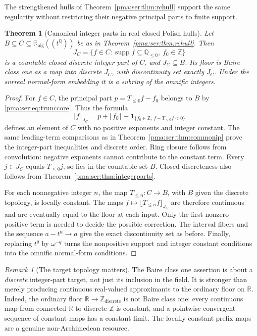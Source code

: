 \documentclass[11pt]{article}
\numberwithin{equation}{section}
\newtheorem{theorem}{Theorem}[section]
\theoremstyle{definition}
\theoremstyle{remark}
\newtheorem{remark}[remark]{Remark}
\newcommand{\Z}{\mathbb Z}
\newcommand{\Q}{\mathbb Q}
\newcommand{\R}{\mathbb R}
\newcommand{\supp}{\operatorname{supp}}
\newcommand{\ka}{\mathbb R_{\mathrm{alg}}}
\begin{document}
The strengthened hulls of Theorem~\ref{pma:ser:thm:rchull} support the same regularity
without restricting their negative principal parts to finite support.

\begin{theorem}[Canonical integer parts in real closed Polish hulls]
\label{pma:ser:thm:hullfloor}
Let $B\subseteq C\subseteq\ka((t^\Q))$ be as in
Theorem~\ref{pma:ser:thm:rchull}. Then
\[
 J_C=\{f\in C:\supp f\subseteq\Q_{\leq0},\ f_0\in\Z\}
\]
is a countable closed discrete integer part of $C$, and $J_C\subseteq B$.
Its floor is Baire class one as a map into discrete $J_C$, with discontinuity
set exactly $J_C$. Under the surreal normal-form embedding it is a subring
of the omnific integers.
\end{theorem}
\begin{proof}
For $f\in C$, the principal part
$p=T_{\leq0}f-f_0$ belongs to $B$ by \eqref{pma:ser:eq:trunccore}. Thus the formula
\[
 \lfloor f\rfloor_{J_C}
 =p+\lfloor f_0\rfloor
  -\mathbf1_{\{f_0\in\Z,\ f-T_{\leq0}f<0\}}
\]
defines an element of $C$ with no positive exponents and integer constant.
The same leading-term comparisons as in Theorem~\ref{pma:ser:thm:commonip} prove
the integer-part inequalities and discrete order. Ring closure follows from
convolution: negative exponents cannot contribute to the constant term.
Every $j\in J_C$ equals $T_{\leq0}j$, so lies in the countable set $B$.
Closed discreteness also follows from Theorem~\ref{pma:ser:thm:integerparts}.

For each nonnegative integer $n$, the map $T_{\leq n}:C\to B$, with $B$
given the discrete topology, is locally constant. The maps
$f\mapsto\lfloor T_{\leq n}f\rfloor_{J_C}$ are therefore continuous and
are eventually equal to the floor at each input. Only the first nonzero
positive term is needed to decide the possible correction. The interval
fibers and the sequence $a-t^n\to a$ give the exact discontinuity set as
before. Finally, replacing $t^q$ by $\omega^{-q}$ turns the nonpositive
support and integer constant conditions into the omnific normal-form
conditions.
\end{proof}

\begin{remark}[The target topology matters]
The Baire class one assertion is about a \emph{discrete} integer-part target,
not just its inclusion in the field. It is stronger than merely producing
continuous real-valued approximants to the ordinary floor on $\R$.
Indeed, the ordinary floor $\R\to\Z_{\mathrm{discrete}}$ is not Baire class
one: every continuous map from connected $\R$ to discrete $\Z$ is constant,
and a pointwise convergent sequence of constant maps has a constant limit.
The locally constant prefix maps are a genuine non-Archimedean resource.
\end{remark}
\end{document}
